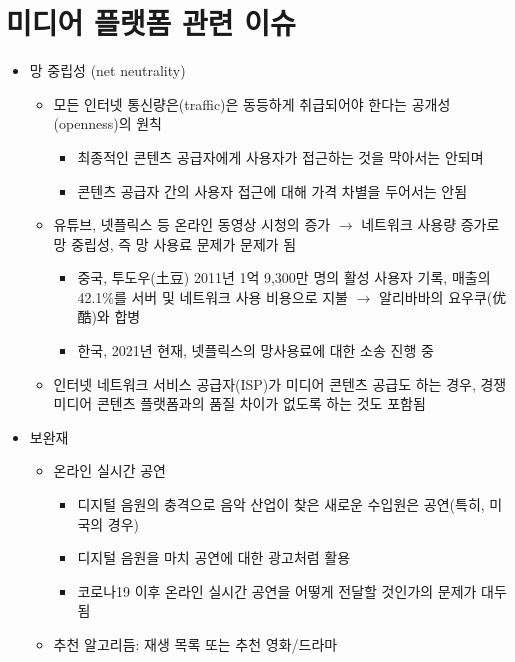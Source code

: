 \section{미디어 플랫폼 관련 이슈}
\begin{itemize}
\item 망 중립성 (net neutrality) \citep{Crawford:2015aa}
	\begin{itemize}
	\item 모든 인터넷 통신량은(traffic)은 동등하게 취급되어야 한다는 공개성(openness)의 원칙
		\begin{itemize}
		\item 최종적인 콘텐츠 공급자에게 사용자가 접근하는 것을 막아서는 안되며
		\item 콘텐츠 공급자 간의 사용자 접근에 대해 가격 차별을 두어서는 안됨
		\end{itemize}	
	\item 유튜브, 넷플릭스 등 온라인 동영상 시청의 증가 $\rightarrow$ 네트워크 사용량 증가로 망 중립성, 즉 망 사용료 문제가 문제가 됨
		\begin{itemize}
		\item 중국, 투도우(土豆) 2011년 1억 9,300만 명의 활성 사용자 기록, 매출의 42.1\%를 서버 및 네트워크 사용 비용으로 지불 $\rightarrow$ 알리바바의 요우쿠(优酷)와 합병
		\item 한국, 2021년 현재, 넷플릭스의 망사용료에 대한 소송 진행 중
		\end{itemize}
	\item 인터넷 네트워크 서비스 공급자(ISP)가 미디어 콘텐츠 공급도 하는 경우, 경쟁 미디어 콘텐츠 플랫폼과의 품질 차이가 없도록 하는 것도 포함됨
	\end{itemize}
\item 보완재
	\begin{itemize}
	\item 온라인 실시간 공연
		\begin{itemize}
		\item 디지털 음원의 충격으로 음악 산업이 찾은 새로운 수입원은 공연(특히, 미국의 경우)
		\item 디지털 음원을 마치 공연에 대한 광고처럼 활용
		\item 코로나19 이후 온라인 실시간 공연을 어떻게 전달할 것인가의 문제가 대두됨
		\end{itemize}
	\item 추천 알고리듬: 재생 목록 또는 추천 영화/드라마

\end{itemize}
\end{itemize}
